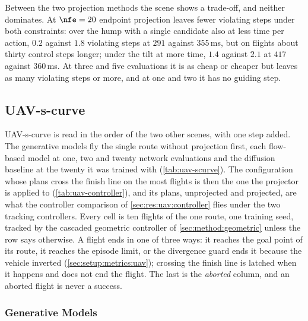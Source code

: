 Between the two projection methods the scene shows a trade-off, and neither dominates. At $\nfe=20$
endpoint projection leaves fewer violating steps under both constraints: over the hump with a single
candidate also at less time per action, $0.2$ against $1.8$ violating steps at $291$ against $355$\,ms, but on
flights about thirty control steps longer; under the tilt at more time, $1.4$ against $2.1$ at $417$ against
$360$\,ms. At three and five evaluations it is as cheap or cheaper but leaves as many violating steps or more,
and at one and two it has no guiding step.

\FloatBarrier
\subsection{UAV-s-curve}\label{sec:res:uav:scurve}

UAV-s-curve is read in the order of the two other scenes, with one step added. The generative models
fly the single route without projection first, each flow-based model at one, two and twenty network
evaluations and the diffusion baseline at the twenty it was trained with (\autoref{tab:uav-scurve}). The
configuration whose plans cross the finish line on the most flights is then the one the projector is
applied to (\autoref{tab:uav-controller}), and its plans, unprojected and projected, are what the
controller comparison of \autoref{sec:res:uav:controller} flies under the two tracking controllers.
Every cell is ten flights of the one route, one training seed, tracked by the cascaded geometric
controller of \autoref{sec:method:geometric} unless the row says otherwise. A flight ends in one of
three ways: it reaches the goal point of its route, it reaches the episode limit, or the divergence guard
ends it because the vehicle inverted (\autoref{sec:setup:metrics:uav}); crossing the finish line is latched
when it happens and does not end the flight. The last is the \emph{aborted} column,
and an aborted flight is never a success.

\subsubsection{Generative Models}\label{sec:res:uav:scurve:models}

